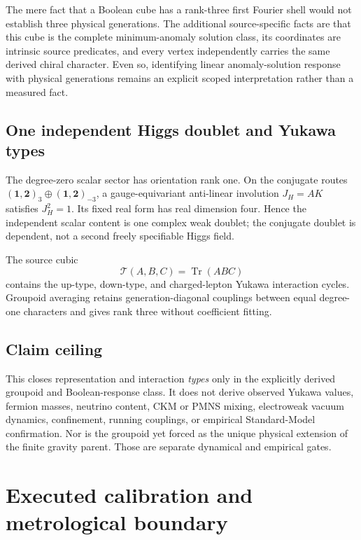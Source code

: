 \documentclass[11pt]{article}
\theoremstyle{definition}
\theoremstyle{remark}
\begin{document}
The mere fact that a Boolean cube has a rank-three first Fourier shell would not establish three physical generations. The additional source-specific facts are that this cube is the complete minimum-anomaly solution class, its coordinates are intrinsic source predicates, and every vertex independently carries the same derived chiral character. Even so, identifying linear anomaly-solution response with physical generations remains an explicit scoped interpretation rather than a measured fact.

\subsection{One independent Higgs doublet and Yukawa types}

The degree-zero scalar sector has orientation rank one. On the conjugate routes $(\mathbf1,\mathbf2)_3\oplus(\mathbf1,\mathbf2)_{-3}$, a gauge-equivariant anti-linear involution $J_H=AK$ satisfies $J_H^2=1$. Its fixed real form has real dimension four. Hence the independent scalar content is one complex weak doublet; the conjugate doublet is dependent, not a second freely specifiable Higgs field.

The source cubic
\begin{equation}
 \mathcal T(A,B,C)=\operatorname{Tr}(ABC)
\end{equation}
contains the up-type, down-type, and charged-lepton Yukawa interaction cycles. Groupoid averaging retains generation-diagonal couplings between equal degree-one characters and gives rank three without coefficient fitting.

\subsection{Claim ceiling}

This closes representation and interaction \emph{types} only in the explicitly derived groupoid and Boolean-response class. It does not derive observed Yukawa values, fermion masses, neutrino content, CKM or PMNS mixing, electroweak vacuum dynamics, confinement, running couplings, or empirical Standard-Model confirmation. Nor is the groupoid yet forced as the unique physical extension of the finite gravity parent. Those are separate dynamical and empirical gates.

\section{Executed calibration and metrological boundary}\label{sec:calibration083}
\end{document}
